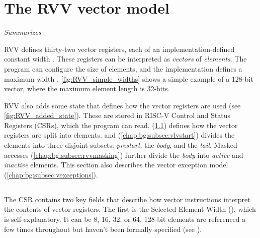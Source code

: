 \section{The RVV vector model}\label{chap:bg:sec:rvv:vector_model}
\emph{Summarizes \cite[Sections 1-6, 17]{specification-RVV-v1.0}}


RVV defines thirty-two vector registers, each of an implementation-defined constant width .
These registers can be interpreted as \emph{vectors} of \emph{elements}.
The program can configure the size of elements, and the implementation defines a maximum width .
\cref{fig:RVV_simple_widths} shows a simple example of a 128-bit vector, where the maximum element length is 32-bits.

RVV also adds some state that defines how the vector registers are used (see \cref{fig:RVV_added_state}).
These are stored in RISC-V Control and Status Registers (CSRs), which the program can read.
 (\cref{chap:bg:subsec:vtype}) defines how the vector registers are split into elements.
 and  (\cref{chap:bg:subsec:vlvstart}) divides the elements into three disjoint subsets: \emph{prestart}, the \emph{body}, and the \emph{tail}.
Masked accesses (\cref{chap:bg:subsec:rvvmasking}) further divide the \emph{body} into \emph{active} and \emph{inactive} elements.
This section also describes the vector exception model (\cref{chap:bg:subsec:vexceptions}).

\subsection{}\label{chap:bg:subsec:vtype}
The  CSR contains two key fields that describe how vector instructions interpret the contents of vector registers.
The first is the Selected Element Width (), which is self-explanatory.
It can be 8, 16, 32, or 64.
128-bit elements are referenced a few times throughout but haven't been formally specified (see \cite[p32]{specification-RVV-v1.0}).

